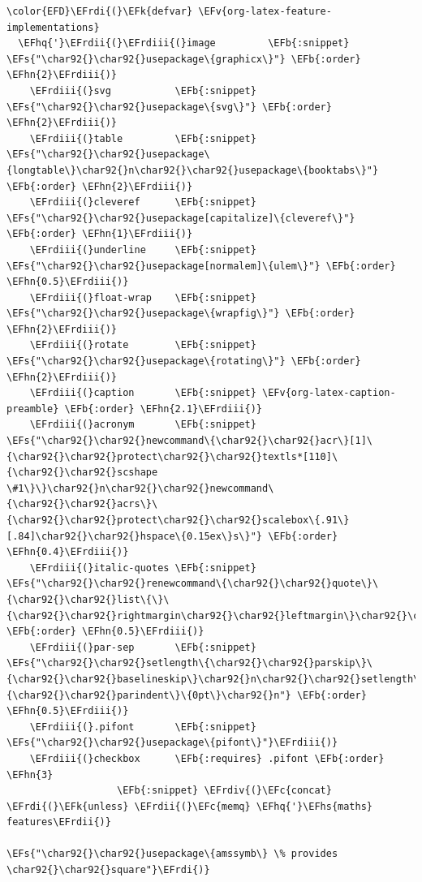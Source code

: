 \documentclass{scrartcl}
\newcommand{\EFk}[1]{\textcolor{EFk}{#1}} %
\newcommand{\EFs}[1]{\textcolor{EFs}{#1}} %
\newcommand{\EFb}[1]{\textcolor{EFb}{#1}} %
\newcommand{\EFc}[1]{\textcolor{EFc}{#1}} %
\newcommand{\EFv}[1]{\textcolor{EFv}{#1}} %
\newcommand{\EFhn}[1]{\textcolor{EFhn}{\textbf{#1}}} %
\newcommand{\EFhq}[1]{\textcolor{EFhq}{#1}} %
\newcommand{\EFhs}[1]{\textcolor{EFhs}{#1}} %
\newcommand{\EFrdi}[1]{\textcolor{EFrdi}{#1}} %
\newcommand{\EFrdii}[1]{\textcolor{EFrdii}{#1}} %
\newcommand{\EFrdiii}[1]{\textcolor{EFrdiii}{#1}} %
\newcommand{\EFrdiv}[1]{\textcolor{EFrdiv}{#1}} %
\begin{document}
\begin{Code}
\begin{Verbatim}[]
\color{EFD}\EFrdi{(}\EFk{defvar} \EFv{org-latex-feature-implementations}
  \EFhq{'}\EFrdii{(}\EFrdiii{(}image         \EFb{:snippet} \EFs{"\char92{}\char92{}usepackage\{graphicx\}"} \EFb{:order} \EFhn{2}\EFrdiii{)}
    \EFrdiii{(}svg           \EFb{:snippet} \EFs{"\char92{}\char92{}usepackage\{svg\}"} \EFb{:order} \EFhn{2}\EFrdiii{)}
    \EFrdiii{(}table         \EFb{:snippet} \EFs{"\char92{}\char92{}usepackage\{longtable\}\char92{}n\char92{}\char92{}usepackage\{booktabs\}"} \EFb{:order} \EFhn{2}\EFrdiii{)}
    \EFrdiii{(}cleveref      \EFb{:snippet} \EFs{"\char92{}\char92{}usepackage[capitalize]\{cleveref\}"} \EFb{:order} \EFhn{1}\EFrdiii{)}
    \EFrdiii{(}underline     \EFb{:snippet} \EFs{"\char92{}\char92{}usepackage[normalem]\{ulem\}"} \EFb{:order} \EFhn{0.5}\EFrdiii{)}
    \EFrdiii{(}float-wrap    \EFb{:snippet} \EFs{"\char92{}\char92{}usepackage\{wrapfig\}"} \EFb{:order} \EFhn{2}\EFrdiii{)}
    \EFrdiii{(}rotate        \EFb{:snippet} \EFs{"\char92{}\char92{}usepackage\{rotating\}"} \EFb{:order} \EFhn{2}\EFrdiii{)}
    \EFrdiii{(}caption       \EFb{:snippet} \EFv{org-latex-caption-preamble} \EFb{:order} \EFhn{2.1}\EFrdiii{)}
    \EFrdiii{(}acronym       \EFb{:snippet} \EFs{"\char92{}\char92{}newcommand\{\char92{}\char92{}acr\}[1]\{\char92{}\char92{}protect\char92{}\char92{}textls*[110]\{\char92{}\char92{}scshape \#1\}\}\char92{}n\char92{}\char92{}newcommand\{\char92{}\char92{}acrs\}\{\char92{}\char92{}protect\char92{}\char92{}scalebox\{.91\}[.84]\char92{}\char92{}hspace\{0.15ex\}s\}"} \EFb{:order} \EFhn{0.4}\EFrdiii{)}
    \EFrdiii{(}italic-quotes \EFb{:snippet} \EFs{"\char92{}\char92{}renewcommand\{\char92{}\char92{}quote\}\{\char92{}\char92{}list\{\}\{\char92{}\char92{}rightmargin\char92{}\char92{}leftmargin\}\char92{}\char92{}item\char92{}\char92{}relax\char92{}\char92{}em\}\char92{}n"} \EFb{:order} \EFhn{0.5}\EFrdiii{)}
    \EFrdiii{(}par-sep       \EFb{:snippet} \EFs{"\char92{}\char92{}setlength\{\char92{}\char92{}parskip\}\{\char92{}\char92{}baselineskip\}\char92{}n\char92{}\char92{}setlength\{\char92{}\char92{}parindent\}\{0pt\}\char92{}n"} \EFb{:order} \EFhn{0.5}\EFrdiii{)}
    \EFrdiii{(}.pifont       \EFb{:snippet} \EFs{"\char92{}\char92{}usepackage\{pifont\}"}\EFrdiii{)}
    \EFrdiii{(}checkbox      \EFb{:requires} .pifont \EFb{:order} \EFhn{3}
                   \EFb{:snippet} \EFrdiv{(}\EFc{concat} \EFrdi{(}\EFk{unless} \EFrdii{(}\EFc{memq} \EFhq{'}\EFhs{maths} features\EFrdii{)}
                                      \EFs{"\char92{}\char92{}usepackage\{amssymb\} \% provides \char92{}\char92{}square"}\EFrdi{)}

\end{Verbatim}
\end{Code}
\end{document}
